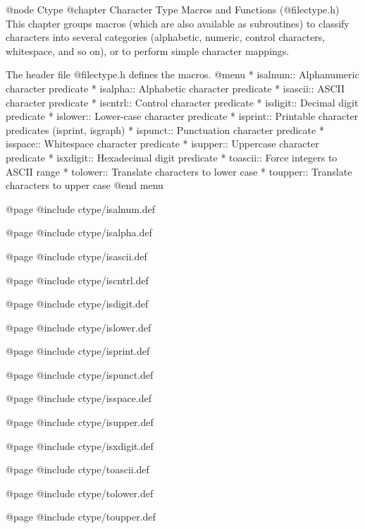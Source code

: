@node Ctype
@chapter Character Type Macros and Functions (@file{ctype.h})
This chapter groups macros (which are also available as subroutines)
to classify characters into several categories (alphabetic,
numeric, control characters, whitespace, and so on), or to perform
simple character mappings.

The header file @file{ctype.h} defines the macros.
@menu 
* isalnum::   Alphanumeric character predicate
* isalpha::   Alphabetic character predicate
* isascii::   ASCII character predicate
* iscntrl::   Control character predicate
* isdigit::   Decimal digit predicate
* islower::   Lower-case character predicate
* isprint::   Printable character predicates (isprint, isgraph)
* ispunct::   Punctuation character predicate
* isspace::   Whitespace character predicate
* isupper::   Uppercase character predicate
* isxdigit::  Hexadecimal digit predicate
* toascii::   Force integers to ASCII range
* tolower::   Translate characters to lower case
* toupper::   Translate characters to upper case
@end menu

@page
@include ctype/isalnum.def

@page
@include ctype/isalpha.def

@page
@include ctype/isascii.def

@page
@include ctype/iscntrl.def

@page
@include ctype/isdigit.def

@page
@include ctype/islower.def

@page
@include ctype/isprint.def

@page
@include ctype/ispunct.def

@page
@include ctype/isspace.def

@page
@include ctype/isupper.def

@page
@include ctype/isxdigit.def

@page
@include ctype/toascii.def

@page
@include ctype/tolower.def

@page
@include ctype/toupper.def


